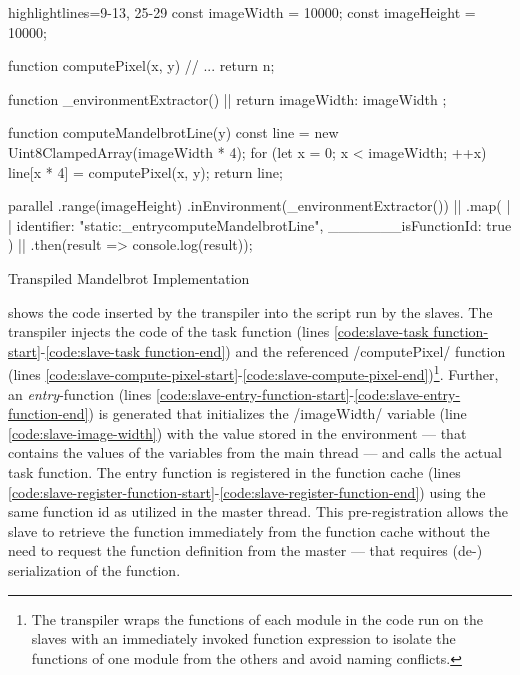 \begin{listing}
	\begin{javascriptcode*}{highlightlines={9-13, 25-29}}
const imageWidth = 10000;
const imageHeight = 10000;

function computePixel(x, y) {
	// ...
	return n;
}

function _environmentExtractor() { |$\label{code:mandelbrot-environment-extractor}$|
	return {
		imageWidth: imageWidth
	};
}

function computeMandelbrotLine(y) {
	const line = new Uint8ClampedArray(imageWidth * 4);
	for (let x = 0; x < imageWidth; ++x) {
		line[x * 4] = computePixel(x, y);
	}
	return line;
}

parallel
	.range(imageHeight)
	.inEnvironment(_environmentExtractor()) |$\label{code:mandelbrot-environment-call}$|
	.map({ |$\label{code:mandelbrot-function-id-start}$|
		identifier: "static:_entrycomputeMandelbrotLine",
		_______isFunctionId: true
	}) |$\label{code:mandelbrot-function-id-end}$|
	.then(result => console.log(result));
\end{javascriptcode*}
\caption{Transpiled Mandelbrot Implementation}
\label{fig:mandelbrot-transpiled}
\end{listing}


 shows the code inserted by the transpiler into the script run by the slaves. The transpiler injects the code of the task function (lines \ref{code:slave-task function-start}-\ref{code:slave-task function-end}) and the referenced \javascriptinline/computePixel/ function (lines \ref{code:slave-compute-pixel-start}-\ref{code:slave-compute-pixel-end})\footnote{The transpiler wraps the functions of each module in the code run on the slaves with an immediately invoked function expression to isolate the functions of one module from the others and avoid naming conflicts.}. Further, an \textit{entry}-function (lines \ref{code:slave-entry-function-start}-\ref{code:slave-entry-function-end}) is generated that initializes the \javascriptinline/imageWidth/ variable (line \ref{code:slave-image-width}) with the value stored in the environment --- that contains the values of the variables from the main thread --- and calls the actual task function. The entry function is registered in the function cache (lines \ref{code:slave-register-function-start}-\ref{code:slave-register-function-end}) using the same function id as utilized in the master thread. This pre-registration allows the slave to retrieve the function immediately from the function cache without the need to request the function definition from the master --- that requires (de-) serialization of the function.

